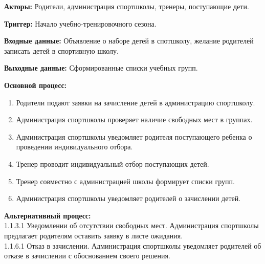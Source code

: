 \documentclass[12pt,a4paper,final]{article} %
\begin{document}
\par \textbf{Акторы:} Родители, администрация спортшколы, тренеры, поступающие дети.
\par \textbf{Триггер:} Начало учебно-тренировочного сезона.
\par \textbf{Входные данные:} Объявление о наборе детей в спотшколу, желание родителей записать детей в спортивную школу.
\par \textbf{Выходные данные:} Сформированные списки учебных групп.

\par \textbf{Основной процесс:}
\begin{enumerate}[nosep, label=1.1.\arabic*]
	\item Родители подают заявки на зачисление детей в администрацию спортшколу.
	\item Администрация спортшколы проверяет наличие свободных мест в группах.
	\item Администрация спортшколы уведомляет родителя поступающего ребенка о проведении индивидуального отбора.
	\item Тренер проводит индивидуальный отбор поступающих детей.
	\item Тренер совместно с администрацией школы формирует списки групп.
	\item Администрация спортшколы уведомляет родителей о зачислении детей.
\end{enumerate}

\par \textbf{Альтернативный процесс:} \\
1.1.3.1 Уведомлении об отсутствии свободных мест. Администрация спортшколы предлагает родителям оставить заявку в листе ожидания. \\
1.1.6.1 Отказ в зачислении. Администрация спортшколы уведомляет родителей об отказе в зачислении с обоснованием своего решения. 
\end{document}
